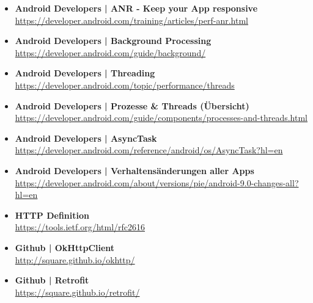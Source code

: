 \documentclass[a4paper]{article}
\begin{document}
	\begin{itemize}
		
		\item \textbf{Android Developers | ANR - Keep your App responsive}\\
		\href{https://developer.android.com/training/articles/perf-anr.html}
		{https://developer.android.com/training/articles/perf-anr.html}
		
		\item \textbf{Android Developers | Background Processing}\\
		\href{https://developer.android.com/guide/background/}
		{https://developer.android.com/guide/background/}
		
		\item \textbf{Android Developers | Threading}\\
		\href{https://developer.android.com/topic/performance/threads}
		{https://developer.android.com/topic/performance/threads}
		
		\item \textbf{Android Developers | Prozesse \& Threads (Übersicht)}\\
		\href{https://developer.android.com/guide/components/processes-and-threads.html}
		{https://developer.android.com/guide/components/processes-and-threads.html}
		
		\item \textbf{Android Developers | AsyncTask}\\
		\href{https://developer.android.com/reference/android/os/AsyncTask?hl=en}
		{https://developer.android.com/reference/android/os/AsyncTask?hl=en}
		
		\item \textbf{Android Developers | Verhaltensänderungen aller Apps}\\
		\href{https://developer.android.com/about/versions/pie/android-9.0-changes-all?hl=en}
		{https://developer.android.com/about/versions/pie/android-9.0-changes-all?hl=en}
		
		\item \textbf{HTTP Definition}\\
		\href{https://tools.ietf.org/html/rfc2616}
		{https://tools.ietf.org/html/rfc2616}
		
		\item \textbf{Github | OkHttpClient}\\
		\href{http://square.github.io/okhttp/}
		{http://square.github.io/okhttp/}
		
		\item \textbf{Github | Retrofit}\\
		\href{https://square.github.io/retrofit/}
		{https://square.github.io/retrofit/}
		

\end{itemize}
\end{document}
